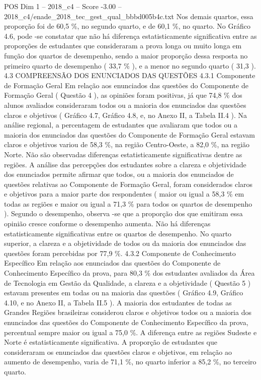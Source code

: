 \begin{textsample}{POS Dim 1 – 2018\_c4 – Score -3.00 – 2018\_c4/enade\_2018\_tec\_gest\_qual\_bbbd005b4c.txt}
Nos demais quartos, essa proporção foi de 60,5 \%, no segundo quarto, e de 60,1 \%, no quarto.
No Gráfico 4.6, pode -se constatar que não há diferença estatisticamente significativa entre as proporções de estudantes que consideraram a prova longa ou muito longa em função dos quartos de desempenho, sendo a maior proporção dessa resposta no primeiro quarto de desempenho ( 33,7 \% ), e a menor no segundo quarto ( 31,3 ). 4.3 COMPREENSÃO DOS ENUNCIADOS DAS QUESTÕES 4.3.1 Componente de Formação Geral Em relação aos enunciados das questões do Componente de Formação Geral ( Questão 4 ), as opiniões foram positivas, já que 74,8 \% dos alunos avaliados consideraram todos ou a maioria dos enunciados das questões claros e objetivos ( Gráfico 4.7, Gráfico 4.8, e, no Anexo II, a Tabela II.4 ).
Na análise regional, a percentagem de estudantes que avaliaram que todos ou a maioria dos enunciados das questões do Componente de Formação Geral estavam claros e objetivos variou de 58,3 \%, na região Centro-Oeste, a 82,0 \%, na região Norte.
Não são observadas diferenças estatisticamente significativas dentre as regiões.
A análise das percepções dos estudantes sobre a clareza e objetividade dos enunciados permite afirmar que todos, ou a maioria dos enunciados de questões relativas ao Componente de Formação Geral, foram considerados claros e objetivos para a maior parte dos respondentes ( maior ou igual a 58,3 \% em todas as regiões e maior ou igual a 71,3 \% para todos os quartos de desempenho ).
Segundo o desempenho, observa -se que a proporção dos que emitiram essa opinião cresce conforme o desempenho aumenta.
Não há diferenças estatisticamente significativas entre os quartos de desempenho.
No quarto superior, a clareza e a objetividade de todos ou da maioria dos enunciados das questões foram percebidas por 77,9 \%. 4.3.2 Componente de Conhecimento Específico Em relação aos enunciados das questões do Componente de Conhecimento Específico da prova, para 80,3 \% dos estudantes avaliados da Área de Tecnologia em Gestão da Qualidade, a clareza e a objetividade ( Questão 5 ) estavam presentes em todas ou na maioria das questões ( Gráfico 4.9, Gráfico 4.10, e no Anexo II, a Tabela II.5 ).
A maioria dos estudantes de todas as Grandes Regiões brasileiras considerou claros e objetivos todos ou a maioria dos enunciados das questões do Componente de Conhecimento Específico da prova, percentual sempre maior ou igual a 75,0 \%.
A diferença entre as regiões Sudeste e Norte é estatisticamente significativa.
A proporção de estudantes que consideraram os enunciados das questões claros e objetivos, em relação ao aumento de desempenho, varia de 71,1 \%, no quarto inferior a 85,2 \%, no terceiro quarto.

\end{textsample}
